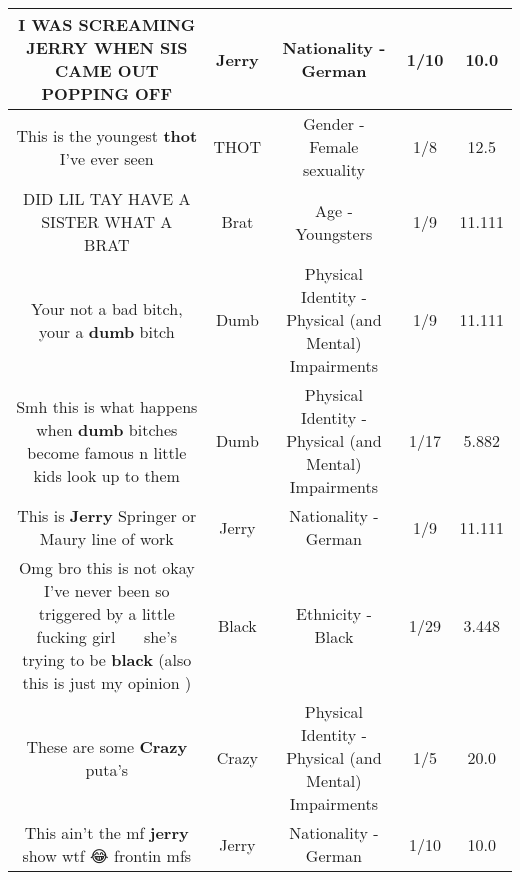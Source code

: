 \documentclass[11pt]{article}
\newlength\mylength
\begin{document}
\begin{center}
\begin{longtable}{|C{.65\mylength}|C{.30\mylength}|C{.12\mylength}|C{.12\mylength}|C{.12\mylength}|}
  \small I WAS SCREAMING \textbf{JERRY} WHEN SIS CAME OUT POPPING OFF\normalsize   & Jerry & Nationality - German & 1/10 & 10.0 \\  \hline
  \small This is the youngest \textbf{thot} I've ever seen\normalsize   & THOT & Gender - Female sexuality & 1/8 & 12.5 \\  \hline
  \small DID LIL TAY HAVE A SISTER WHAT A BRAT\normalsize   & Brat & Age - Youngsters & 1/9 & 11.111 \\  \hline
  \small Your not a bad bitch, your a \textbf{dumb} bitch\normalsize   & Dumb & Physical Identity - Physical (and Mental) Impairments & 1/9 & 11.111 \\  \hline
  \small Smh this is what happens when \textbf{dumb} bitches become famous n little kids look up to them\normalsize   & Dumb & Physical Identity - Physical (and Mental) Impairments & 1/17 & 5.882 \\  \hline
  \small This is \textbf{Jerry} Springer or Maury line of work\normalsize   & Jerry & Nationality - German & 1/9 & 11.111 \\  \hline
  \small Omg bro this is not okay I've never been so triggered by a little fucking girl 🤦🏻‍♀️😬 she's trying to be \textbf{black} (also this is just my opinion )\normalsize   & Black & Ethnicity - Black & 1/29 & 3.448 \\  \hline
  \small These are some \textbf{Crazy} puta's\normalsize   & Crazy & Physical Identity - Physical (and Mental) Impairments & 1/5 & 20.0 \\  \hline
  \small This ain't the mf \textbf{jerry} show wtf 😂 frontin mfs\normalsize   & Jerry & Nationality - German & 1/10 & 10.0 \\  \hline

\end{longtable}
\end{center}
\end{document}
